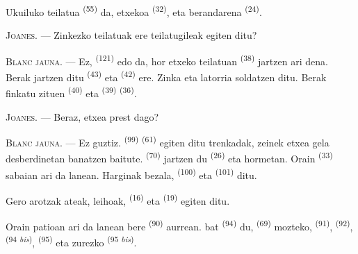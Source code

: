 
Ukuiluko teilatua  \textsuperscript{(55)} da, etxekoa
 \textsuperscript{(32)}, eta berandarena
 \textsuperscript{(24)}.

\textsc{Joanes}. --- Zinkezko teilatuak ere teilatugileak egiten ditu?

\textsc{Blanc jauna}. --- Ez,  \textsuperscript{(121)} edo
 da, hor etxeko teilatuan 
\textsuperscript{(38)} jartzen ari dena. Berak jartzen ditu 
\textsuperscript{(43)} eta  \textsuperscript{(42)} ere. Zinka
eta latorria soldatzen ditu. Berak finkatu zituen 
\textsuperscript{(40)} eta  \textsuperscript{(39)}
 \textsuperscript{(36)}.

\textsc{Joanes}. --- Beraz, etxea prest dago?

\VUsaut{3.0mm}
\VUsaut{3.0mm}

\textsc{Blanc jauna}. --- Ez guztiz. 
\textsuperscript{(99)}  \textsuperscript{(61)} egiten ditu
trenkadak, zeinek etxea gela desberdinetan banatzen baitute. 
\textsuperscript{(70)} jartzen du  \textsuperscript{(26)} eta
hormetan. Orain  \textsuperscript{(33)} sabaian ari da lanean.
Harginak bezala,  \textsuperscript{(100)} eta 
\textsuperscript{(101)} ditu.

Gero arotzak ateak, leihoak,  \textsuperscript{(16)} eta
 \textsuperscript{(19)} egiten ditu.

Orain patioan ari da lanean bere  \textsuperscript{(90)}
aurrean.  bat \textsuperscript{(94)} du, 
\textsuperscript{(69)} mozteko,  \textsuperscript{(91)},
 \textsuperscript{(92)},  \textsuperscript{(94
\textit{bis})},  \textsuperscript{(95)} eta zurezko
 \textsuperscript{(95 \textit{bis})}.

